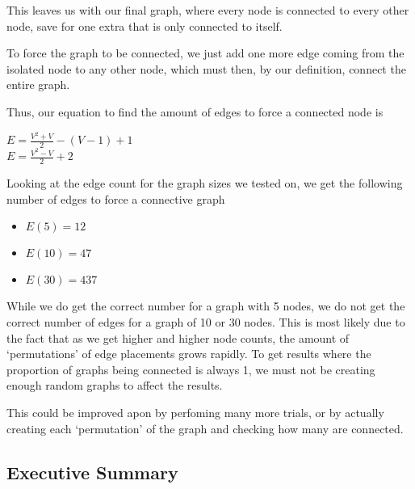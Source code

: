 \documentclass[12pt]{article}
\begin{document}
This leaves us with our final graph, where every node is connected to every other node, save for one extra that is only connected to itself.

To force the graph to be connected, we just add one more edge coming from the isolated node to any other node, which must then, by our definition, connect the entire graph.

Thus, our equation to find the amount of edges to force a connected node is
\begin{center}
    $E = \frac{V^2 + V}{2} - (V-1) + 1$\\
    $E = \frac{V^2 - V}{2} + 2$
\end{center}

Looking at the edge count for the graph sizes we tested on, we get the following number of edges to force a connective graph

\begin{itemize}
    \item $E(5) = 12$ 
    \item $E(10) = 47$ 
    \item $E(30) = 437$ 
\end{itemize}

While we do get the correct number for a graph with 5 nodes, we do not get the correct number of edges for a graph of 10 or 30 nodes. This is most likely due to the fact that as we get higher and higher node counts, the
amount of `permutations' of edge placements grows rapidly. To get results where the proportion of graphs being connected is always 1, we must not be creating enough random graphs to affect the results.

This could be improved apon by perfoming many more trials, or by actually creating each `permutation' of the graph and checking how many are connected.

%
%
%
%
\newpage
\subsection{Executive Summary}

%
%
%
%
\newpage
\end{document}
